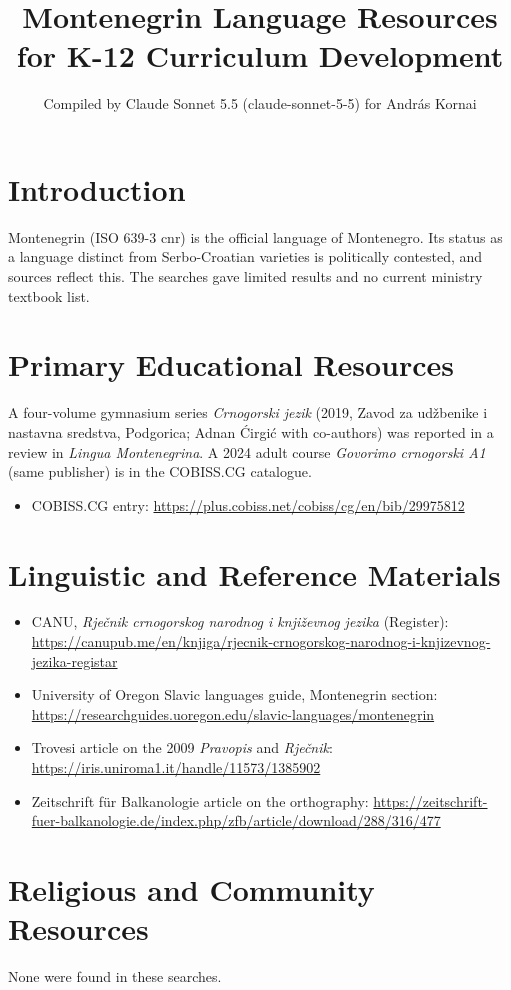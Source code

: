 \documentclass[12pt]{article}
\title{Montenegrin Language Resources for K-12 Curriculum Development}
\author{Compiled by Claude Sonnet 5.5 (claude-sonnet-5-5) for Andr\'as Kornai}
\date{}
\begin{document}
\maketitle

\section{Introduction}
Montenegrin (ISO 639-3 cnr) is the official language of Montenegro. Its status as a language distinct from Serbo-Croatian varieties is politically contested, and sources reflect this. The searches gave limited results and no current ministry textbook list.

\section{Primary Educational Resources}
A four-volume gymnasium series \emph{Crnogorski jezik} (2019, Zavod za udžbenike i nastavna sredstva, Podgorica; Adnan \'Cirgi\'c with co-authors) was reported in a review in \emph{Lingua Montenegrina}. A 2024 adult course \emph{Govorimo crnogorski A1} (same publisher) is in the COBISS.CG catalogue.
\begin{itemize}
\item COBISS.CG entry: \url{https://plus.cobiss.net/cobiss/cg/en/bib/29975812}
\end{itemize}

\section{Linguistic and Reference Materials}
\begin{itemize}
\item CANU, \emph{Rje\v{c}nik crnogorskog narodnog i knji\v{z}evnog jezika} (Register): \url{https://canupub.me/en/knjiga/rjecnik-crnogorskog-narodnog-i-knjizevnog-jezika-registar}
\item University of Oregon Slavic languages guide, Montenegrin section: \url{https://researchguides.uoregon.edu/slavic-languages/montenegrin}
\item Trovesi article on the 2009 \emph{Pravopis} and \emph{Rje\v{c}nik}: \url{https://iris.uniroma1.it/handle/11573/1385902}
\item Zeitschrift f\"ur Balkanologie article on the orthography: \url{https://zeitschrift-fuer-balkanologie.de/index.php/zfb/article/download/288/316/477}
\end{itemize}

\section{Religious and Community Resources}
None were found in these searches.
\end{document}
